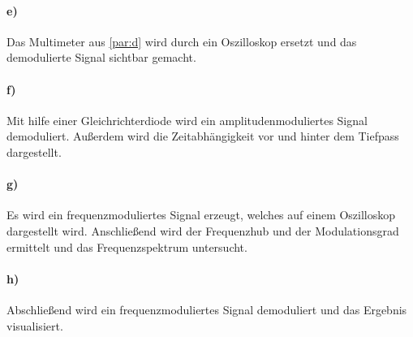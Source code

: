 \paragraph{e)}
\label{par:e}
Das Multimeter aus \ref{par:d} wird durch ein Oszilloskop ersetzt und das demodulierte Signal sichtbar gemacht.

\paragraph{f)}
\label{par:f}
Mit hilfe einer Gleichrichterdiode wird ein amplitudenmoduliertes Signal demoduliert.
Außerdem wird die Zeitabhängigkeit vor und hinter dem Tiefpass dargestellt.

\paragraph{g)}
\label{par:g}
Es wird ein frequenzmoduliertes Signal erzeugt, welches auf einem Oszilloskop dargestellt wird. Anschließend wird der Frequenzhub und
der Modulationsgrad ermittelt und das Frequenzspektrum untersucht.

\paragraph{h)}
\label{par:h}
Abschließend wird ein frequenzmoduliertes Signal demoduliert und das Ergebnis visualisiert.